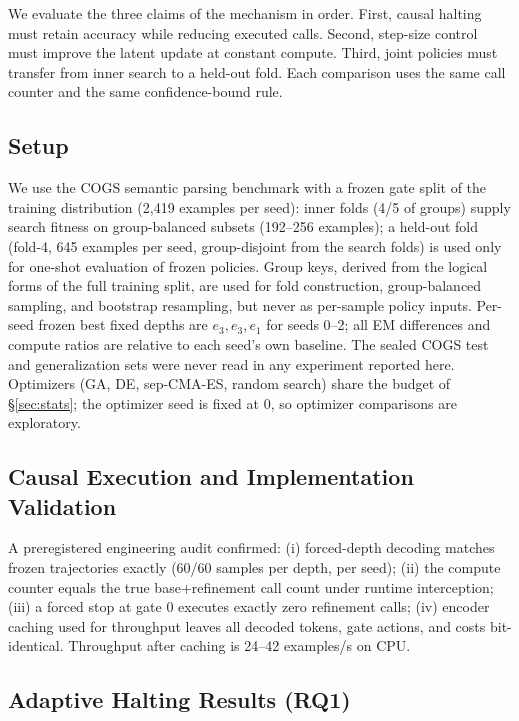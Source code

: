 \documentclass[11pt]{article}
\begin{document}
We evaluate the three claims of the mechanism in order. First, causal halting must retain accuracy while reducing executed calls. Second, step-size control must improve the latent update at constant compute. Third, joint policies must transfer from inner search to a held-out fold. Each comparison uses the same call counter and the same confidence-bound rule.

\subsection{Setup}
\label{sec:setup}
We use the COGS semantic parsing benchmark \citep{kim2020cogs} with a frozen gate split of the training distribution (2{,}419 examples per seed): inner folds (4/5 of groups) supply search fitness on group-balanced subsets (192--256 examples); a held-out fold (fold-4, 645 examples per seed, group-disjoint from the search folds) is used only for one-shot evaluation of frozen policies. Group keys, derived from the logical forms of the full training split, are used for fold construction, group-balanced sampling, and bootstrap resampling, but never as per-sample policy inputs. Per-seed frozen best fixed depths are $e_3, e_3, e_1$ for seeds 0--2; all EM differences and compute ratios are relative to each seed's own baseline. The sealed COGS test and generalization sets were never read in any experiment reported here. Optimizers (GA, DE, sep-CMA-ES, random search) share the budget of \S\ref{sec:stats}; the optimizer seed is fixed at 0, so optimizer comparisons are exploratory.

\subsection{Causal Execution and Implementation Validation}
A preregistered engineering audit confirmed: (i) forced-depth decoding matches frozen trajectories exactly (60/60 samples per depth, per seed); (ii) the compute counter equals the true base+refinement call count under runtime interception; (iii) a forced stop at gate 0 executes exactly zero refinement calls; (iv) encoder caching used for throughput leaves all decoded tokens, gate actions, and costs bit-identical. Throughput after caching is 24--42 examples/s on CPU.

\subsection{Adaptive Halting Results (RQ1)}
\label{sec:exp-halting}
\end{document}
